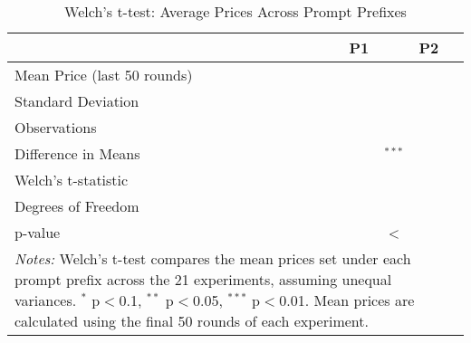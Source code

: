 \appendix
\begin{table}[htpb!]
    \centering
    \caption{Welch’s t-test: Average Prices Across Prompt Prefixes}
    \label{tab:welch_test_1}
    \begin{tabular}{lcc}
    \toprule
    & P1 & P2 \\
    \midrule
    Mean Price (last 50 rounds) &  &  \\
    Standard Deviation          &  &  \\
    Observations                &  &  \\
    \midrule
    Difference in Means         & \multicolumn{2}{c}{$^{***}$} \\
    Welch's t-statistic         & \multicolumn{2}{c}{} \\
    Degrees of Freedom          & \multicolumn{2}{c}{} \\
    p-value                     & \multicolumn{2}{c}{<} \\
    \bottomrule
    \multicolumn{3}{p{0.9\linewidth}}{\footnotesize \textit{Notes:} Welch’s t-test compares the mean prices set under each prompt prefix across the 21 experiments, assuming unequal variances. $^{*}$ p$<$0.1, $^{**}$ p$<$0.05, $^{***}$ p$<$0.01. Mean prices are calculated using the final 50 rounds of each experiment.}
    \end{tabular}
\end{table}

